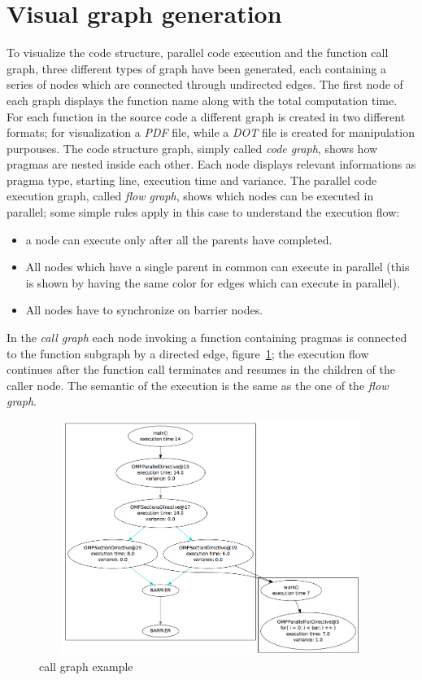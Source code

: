 \documentclass[a4paper,11pt,oneside]{book}
\begin{document}
\section{Visual graph generation}

To visualize the code structure, parallel code execution and the function call graph, three different types of graph have been generated, each containing a series of nodes which are connected through undirected edges. The first node of each graph displays the function name along with the total computation time. For each function in the source code a different graph is created in two different formats; for visualization a \emph{PDF} file, while a \emph{DOT} file is created for manipulation purpouses. The code structure graph, simply called \emph{code graph}, shows how pragmas are nested inside each other. Each node displays relevant informations as pragma type, starting line, execution time and variance. The parallel code execution graph, called \emph{flow graph}, shows which nodes can be executed in parallel; some simple rules apply in this case to understand the execution flow:
\begin{itemize}
\item{a node can execute only after all the parents have completed.}
\item{All nodes which have a single parent in common can execute in parallel (this is shown by having the same color for edges which can execute in parallel).}
\item{All nodes have to synchronize on barrier nodes.}
\end{itemize}
In the \emph{call graph} each node invoking a function containing pragmas is connected to the function subgraph by a directed edge, figure~\ref{call_graph}; the execution flow continues after the function call terminates and resumes in the children of the caller node. The semantic of the execution is the same as the one of the \emph{flow graph}.

\begin{figure}[H]
\centering
\includegraphics[width = 130mm, height = 76mm]{call_graph.png}
\caption{call graph example}
\label{call_graph}
\end{figure}
\end{document}
